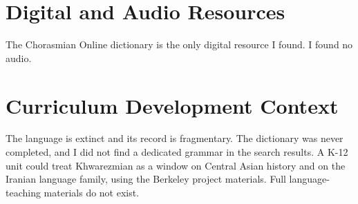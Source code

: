 \documentclass[12pt]{article}
\begin{document}
\section{Digital and Audio Resources}
The Chorasmian Online dictionary is the only digital resource I found. I found no audio.

\section{Curriculum Development Context}
The language is extinct and its record is fragmentary. The dictionary was never completed, and I did not find a dedicated grammar in the search results. A K-12 unit could treat Khwarezmian as a window on Central Asian history and on the Iranian language family, using the Berkeley project materials. Full language-teaching materials do not exist.
\end{document}
